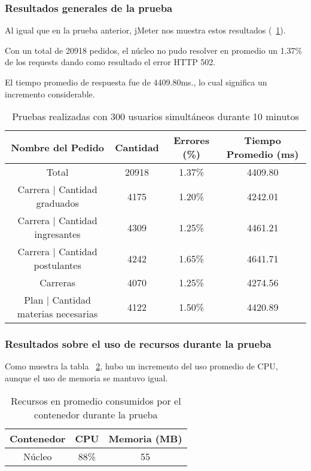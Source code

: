 \subsubsection{Resultados generales de la prueba}

Al igual que en la prueba anterior, jMeter nos muestra estos resultados (~\ref{tab:300u_10m_gen}).

Con un total de 20918 pedidos, el núcleo no pudo resolver en promedio un 1.37\% de los requests dando como resultado el error HTTP 502.

El tiempo promedio de respuesta fue de 4409.80ms., lo cual significa un incremento considerable.

\begin{table}[!htbp]
    \centering
    \makegapedcells
    \begin{tabular}{|c|c|c|c|}
    \hline
    Nombre del Pedido & Cantidad & Errores (\%) & Tiempo Promedio (ms) \\ \hline
    Total & 20918 & 1.37\% & 4409.80\\ \hline
    Carrera | Cantidad graduados & 4175 & 1.20\% & 4242.01\\ \hline
    Carrera | Cantidad ingresantes & 4309 & 1.25\% & 4461.21\\ \hline
    Carrera | Cantidad postulantes & 4242 & 1.65\% & 4641.71\\ \hline
    Carreras & 4070 & 1.25\% & 4274.56\\ \hline
    Plan | Cantidad materias necesarias & 4122 & 1.50\% & 4420.89\\ \hline
    \end{tabular}
    \caption{Pruebas realizadas con 300 usuarios simultáneos durante 10 minutos}
    \label{tab:300u_10m_gen}
\end{table}



\subsubsection{Resultados sobre el uso de recursos durante la prueba}

Como muestra la tabla ~\ref{tab:300u_10m_rec}, hubo un incremento del uso promedio de CPU, aunque el uso de memoria se mantuvo igual.

\begin{table}[!htbp]
    \centering
    \makegapedcells
    \begin{tabular}{|c|c|c|}
    \hline
    Contenedor & CPU & Memoria (MB)\\ \hline
    Núcleo & 88\% & 55 \\ \hline
    \end{tabular}
    \caption{Recursos en promedio consumidos por el contenedor durante la prueba}
    \label{tab:300u_10m_rec}
\end{table}

